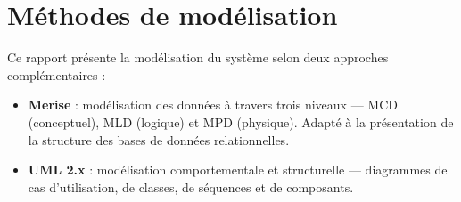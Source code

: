 \section{Méthodes de modélisation}

Ce rapport présente la modélisation du système selon deux approches complémentaires :

\begin{itemize}[itemsep=3pt]
  \item \textbf{Merise} : modélisation des données à travers trois niveaux —
    MCD (conceptuel), MLD (logique) et MPD (physique). Adapté à la présentation
    de la structure des bases de données relationnelles.
  \item \textbf{UML 2.x} : modélisation comportementale et structurelle — diagrammes
    de cas d'utilisation, de classes, de séquences et de composants.
\end{itemize}
